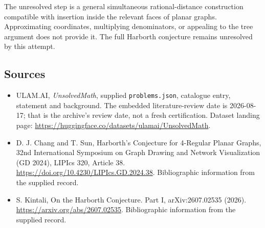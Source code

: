 \documentclass[11pt,a4paper]{article}
\begin{document}
The unresolved step is a general simultaneous rational-distance construction compatible with insertion inside the relevant faces of planar graphs. Approximating coordinates, multiplying denominators, or appealing to the tree argument does not provide it. The full Harborth conjecture remains unresolved by this attempt.

\subsection{Sources}

{\small

\begin{itemize}

\item[\hypertarget{source:statement:1}{S1}] ULAM.AI, \emph{UnsolvedMath}, supplied \texttt{problems.json}, catalogue entry, statement and background. The embedded literature-review date is 2026-08-17; that is the archive’s review date, not a fresh certification. Dataset landing page: \url{https://huggingface.co/datasets/ulamai/UnsolvedMath}.

\item[\hypertarget{source:statement:2}{S2}] D. J. Chang and T. Sun, Harborth's Conjecture for 4-Regular Planar Graphs, 32nd International Symposium on Graph Drawing and Network Visualization (GD 2024), LIPIcs 320, Article 38. \url{https://doi.org/10.4230/LIPIcs.GD.2024.38}. Bibliographic information from the supplied record.

\item[\hypertarget{source:statement:3}{S3}] S. Kintali, On the Harborth Conjecture. Part I, arXiv:2607.02535 (2026). \url{https://arxiv.org/abs/2607.02535}. Bibliographic information from the supplied record.

\end{itemize}

}

\label{end:statement}
\end{document}
